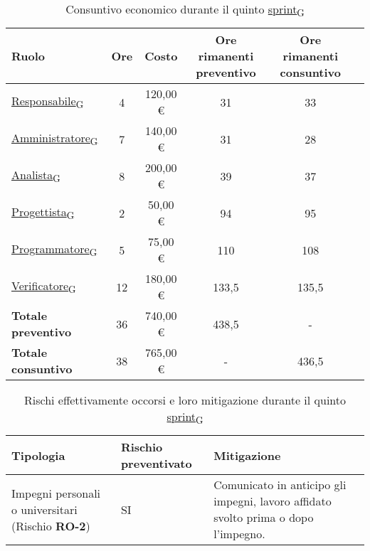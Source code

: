  \begin{table}[!h]
     \centering
     \begin{tabular}{ | l | c | c | c | c | c | }
         \hline
         \textbf{Ruolo} & \textbf{Ore} & \textbf{Costo} & \textbf{Ore rimanenti preventivo} & \textbf{Ore rimanenti consuntivo} \\
         \hline
         \href{https://7last.github.io/docs/pb/documentazione-interna/glossario\#responsabile}{Responsabile\textsubscript{G}}               &  4   &    120,00 € &   31   &   33   \\
         \href{https://7last.github.io/docs/pb/documentazione-interna/glossario\#amministratore}{Amministratore\textsubscript{G}}             &  7   &    140,00 € &   31   &   28   \\
         \href{https://7last.github.io/docs/pb/documentazione-interna/glossario\#analista}{Analista\textsubscript{G}}                   &  8   &    200,00 € &   39   &   37   \\
         \href{https://7last.github.io/docs/pb/documentazione-interna/glossario\#progettista}{Progettista\textsubscript{G}}                &  2   &    50,00 € &   94   &   95   \\
         \href{https://7last.github.io/docs/pb/documentazione-interna/glossario\#programmatore}{Programmatore\textsubscript{G}}              &  5   &    75,00 € &   110   &   108   \\
         \href{https://7last.github.io/docs/pb/documentazione-interna/glossario\#verificatore}{Verificatore\textsubscript{G}}               &  12   &    180,00 € &   133,5   &   135,5   \\
         \hline
         \textbf{Totale preventivo} &  36   &    740,00 € &   438,5   &   -   \\
         \hline
         \textbf{Totale consuntivo} &  38   &    765,00 € &   -   &   436,5   \\
         \hline
     \end{tabular}
     \caption{Consuntivo economico durante il quinto \href{https://7last.github.io/docs/pb/documentazione-interna/glossario\#sprint}{sprint\textsubscript{G}}}
 \end{table}
\newpage
 \begin{table}[!h]
     \centering
     \begin{tabular}{ | p{6cm} | p{2.5cm} | p{7.5cm} | }
         \hline
         \textbf{Tipologia} & \textbf{Rischio preventivato} & \textbf{Mitigazione}  \\
         \hline
         Impegni personali o universitari (Rischio \textbf{RO-2})& SI & Comunicato in anticipo gli impegni, lavoro affidato svolto prima o dopo l'impegno.\\
         \hline
     \end{tabular}
     \caption{Rischi effettivamente occorsi e loro mitigazione durante il quinto \href{https://7last.github.io/docs/pb/documentazione-interna/glossario\#sprint}{sprint\textsubscript{G}}}

 \end{table}

